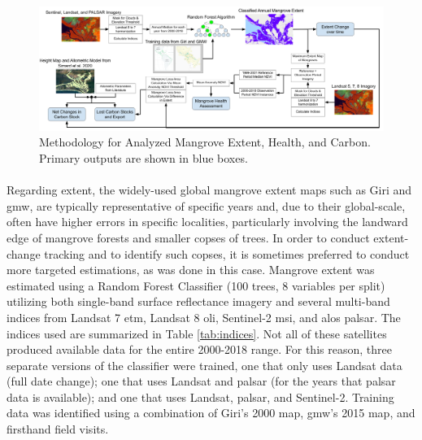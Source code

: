 \begin{landscape}
\begin{figure}[t]
	\centering
	\includegraphics[scale=0.225]{Figures/chap4/extent_method.png}
	\caption[Mangrove Analysis Methodology]{Methodology for Analyzed Mangrove Extent, Health, and Carbon. Primary outputs are shown in blue boxes.}
	\label{fig:extent_method}
\end{figure}
\end{landscape}

\paragraph{} \label{sec:rio-mangrove-extent} \leavevmode\newline

Regarding extent, the widely-used global mangrove extent maps such as Giri and \ac{gmw}, are typically representative of specific years and, due to their global-scale, often have higher errors in specific localities, particularly involving the landward edge of mangrove forests and smaller copses of trees. In order to conduct extent-change tracking and to identify such copses, it is sometimes preferred to conduct more targeted estimations, as was done in this case. Mangrove extent was estimated using a Random Forest Classifier (100 trees, 8 variables per split) utilizing both single-band surface reflectance imagery and several multi-band indices from Landsat 7 \ac{etm}, Landsat 8 \ac{oli}, Sentinel-2 \ac{msi}, and \ac{alos} \ac{palsar}. The indices used are summarized in Table \ref{tab:indices}. Not all of these satellites produced available data for the entire 2000-2018 range. For this reason, three separate versions of the classifier were trained, one that only uses Landsat data (full date change); one that uses Landsat and \ac{palsar} (for the years that \ac{palsar} data is available); and one that uses Landsat, \ac{palsar}, and Sentinel-2. Training data was identified using a combination of Giri's 2000 map, \ac{gmw}'s 2015 map, and firsthand field visits. 


